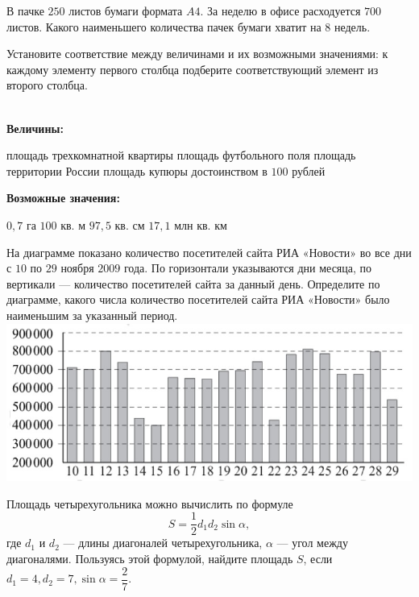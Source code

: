 \begin{class}[number=5]
	\begin{listofex}
		\item В пачке \(250\) листов бумаги формата \(A4\). За неделю в офисе расходуется \(700\) листов. Какого наименьшего количества пачек бумаги хватит на \(8\) недель.
		\item Установите соответствие между величинами и их возможными значениями: к каждому элементу первого столбца подберите соответствующий элемент из второго столбца. \\ \\
		\begin{minipage}[t]{0.58\linewidth}
			\textbf{Величины:}
			\begin{tasks}
				\task площадь трехкомнатной квартиры
				\task площадь футбольного поля
				\task площадь территории России
				\task площадь купюры достоинством в \(100\) рублей \\
			\end{tasks}
		\end{minipage}
		\hspace{0.05\linewidth}
		\begin{minipage}[t]{\textwidth}
			\textbf{Возможные значения:}
			\begin{tasks}
				\task \( 0,7 \) га
				\task \( 100 \) кв. м
				\task \( 97,5 \) кв. см
				\task \( 17,1 \) млн кв. км
			\end{tasks}
		\end{minipage}
		\item На диаграмме показано количество посетителей сайта РИА «Новости» во все дни с \(10\) по \(29\) ноября \(2009\) года. По горизонтали указываются дни месяца, по вертикали --- количество посетителей сайта за данный день. Определите по диаграмме, какого числа количество посетителей сайта РИА «Новости» было наименьшим за указанный период.
		\includegraphics[align=t, width=\linewidth]{../pics/G101M8L5-1}
		\item Площадь четырехугольника можно вычислить по формуле \[S=\dfrac{ 1 }{ 2 }d_1 d_2 \sin \alpha,\] где \(d_1\) и \(d_2\) --- длины диагоналей четырехугольника, \(\alpha\) --- угол между диагоналями. Пользуясь этой формулой, найдите площадь \(S\), если \(d_1=4, d_2 = 7, \sin \alpha = \dfrac{  2}{ 7 }\).

\end{listofex}
\end{class}
